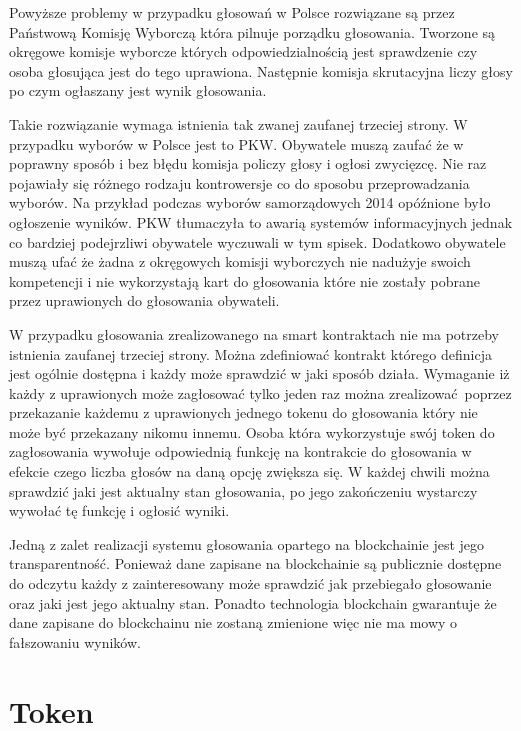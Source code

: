 \documentclass[]{llncs}
\begin{document}
  Powyższe problemy w przypadku głosowań w Polsce rozwiązane są przez Państwową
  Komisję Wyborczą która pilnuje porządku głosowania. Tworzone są okręgowe
  komisje wyborcze których odpowiedzialnością jest sprawdzenie czy osoba
  głosująca jest do tego uprawiona. Następnie komisja skrutacyjna liczy głosy po
  czym ogłaszany jest wynik głosowania.

  Takie rozwiązanie wymaga istnienia tak zwanej zaufanej trzeciej strony. W
  przypadku wyborów w Polsce jest to PKW. Obywatele muszą zaufać że w poprawny
  sposób i bez błędu komisja policzy głosy i ogłosi zwycięzcę. Nie raz pojawiały
  się różnego rodzaju kontrowersje co do sposobu przeprowadzania wyborów.  Na
  przykład podczas wyborów samorządowych 2014 opóźnione było ogłoszenie wyników.
  PKW tłumaczyła to awarią systemów informacyjnych jednak co bardziej
  podejrzliwi obywatele wyczuwali w tym spisek. Dodatkowo obywatele muszą ufać
  że żadna z okręgowych komisji wyborczych nie nadużyje swoich kompetencji i nie
  wykorzystają kart do głosowania które nie zostały pobrane przez uprawionych do
  głosowania obywateli.

  W przypadku głosowania zrealizowanego na smart kontraktach nie ma potrzeby
  istnienia zaufanej trzeciej strony. Można zdefiniować kontrakt którego
  definicja jest ogólnie dostępna i każdy może sprawdzić w jaki sposób działa.
  Wymaganie iż każdy z uprawionych może zagłosować tylko jeden raz można
  zrealizować poprzez przekazanie każdemu z uprawionych jednego tokenu do
  głosowania który nie może być przekazany nikomu innemu. Osoba która
  wykorzystuje swój token do zagłosowania wywołuje odpowiednią funkcję na
  kontrakcie do głosowania w efekcie czego liczba głosów na daną opcję zwiększa
  się. W każdej chwili można sprawdzić jaki jest aktualny stan głosowania, po
  jego zakończeniu wystarczy wywołać tę funkcję i ogłosić wyniki.

  Jedną z zalet realizacji systemu głosowania opartego na blockchainie jest jego
  transparentność. Ponieważ dane zapisane na blockchainie są publicznie dostępne
  do odczytu każdy z zainteresowany może sprawdzić jak przebiegało głosowanie
  oraz jaki jest jego aktualny stan. Ponadto technologia blockchain gwarantuje
  że dane zapisane do blockchainu nie zostaną zmienione więc nie ma mowy o
  fałszowaniu wyników.

\section{Token}
\end{document}
